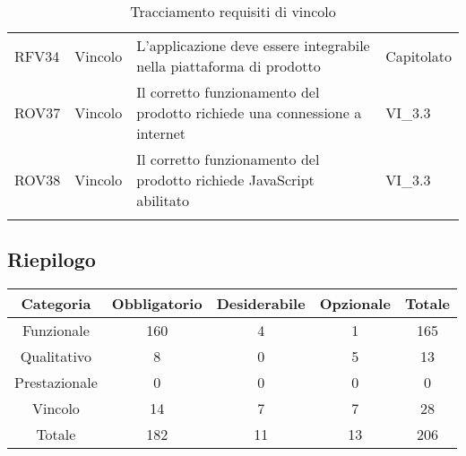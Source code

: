 \begin{longtable}{p{2cm}!{\VRule[1pt]}p{2cm}!{\VRule[1pt]}p{5cm}!{\VRule[1pt]}p{1.5cm}}
RFV34&Vincolo\newline  & L'applicazione deve essere integrabile nella piattaforma di prodotto & Capitolato \\
ROV37&Vincolo\newline  & Il corretto funzionamento del prodotto richiede una connessione a internet & VI_3.3 \\
ROV38&Vincolo\newline  & Il corretto funzionamento del prodotto richiede JavaScript abilitato & VI_3.3 \\
\caption{Tracciamento requisiti di vincolo}
\end{longtable}

\subsection{Riepilogo}

\begin{table}[H]
	\centering
	\begin{tabular}{c c c c c}
		\rowcolor{I}
		\toprule
		\color{white} \textbf{Categoria} &\color{white} \textbf{Obbligatorio} & \color{white}\textbf{Desiderabile} & \color{white}\textbf{Opzionale} & \color{white} \textbf{Totale} \\ 
		\midrule
		Funzionale & 160& 4& 1 & 165\\
		Qualitativo & 8&0 & 5 & 13\\
		Prestazionale &0 &0 &0 & 0\\
		Vincolo &14 &7 &7 & 28\\
		Totale & 182 & 11 & 13 &206 \\
	\end{tabular}
\end{table}
